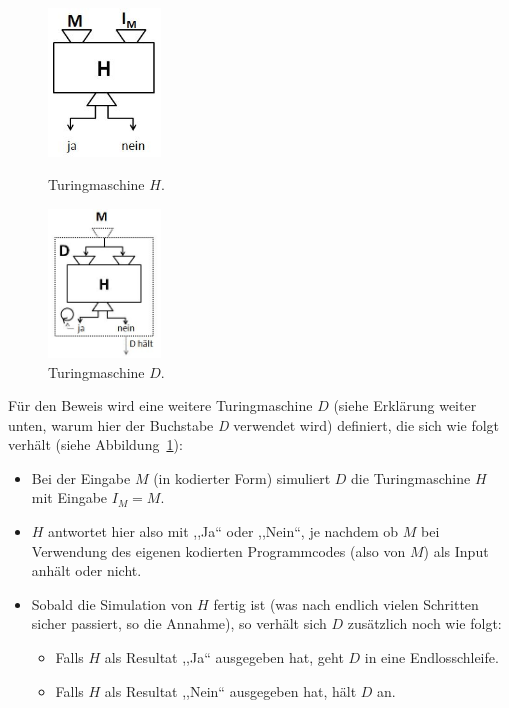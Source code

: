 \begin{figure}[h]
 \begin{minipage}[h]{0.475\textwidth}
  \begin{center}
   \includegraphics[width=3cm]{img/haltingproblem1.jpg}
   \caption{Turingmaschine $H$.}
   \label{fig:haltingproblem1}
  \end{center}
 \end{minipage}%
 \begin{minipage}[h]{0.475\textwidth}
  \begin{center}
   \includegraphics[width=3cm]{img/haltingproblem2.jpg}
   \caption{Turingmaschine $D$.}
   \label{fig:haltingproblem2}
  \end{center}
 \end{minipage}
\end{figure}

Für den Beweis wird eine weitere Turingmaschine $D$ (siehe Erklärung weiter unten, warum hier der Buchstabe \emph{D} verwendet wird) definiert, die sich wie folgt verhält (siehe Abbildung~\ref{fig:haltingproblem2}):
\begin{itemize}
  \item Bei der Eingabe $M$ (in kodierter Form) simuliert $D$ die Turingmaschine $H$ mit Eingabe $I_M = M$.
  \item $H$ antwortet hier also mit ,,Ja`` oder ,,Nein``, je nachdem ob $M$ bei Verwendung des eigenen kodierten Programmcodes (also von $M$) als Input anhält oder nicht.
  \item Sobald die Simulation von $H$ fertig ist (was nach endlich vielen Schritten sicher passiert, so die Annahme), so verhält sich $D$ zusätzlich noch wie folgt:
    \begin{itemize}
      \item Falls $H$ als Resultat ,,Ja`` ausgegeben hat, geht $D$ in eine Endlosschleife.
      \item Falls $H$ als Resultat ,,Nein`` ausgegeben hat, hält $D$  an.
    \end{itemize}
\end{itemize}

